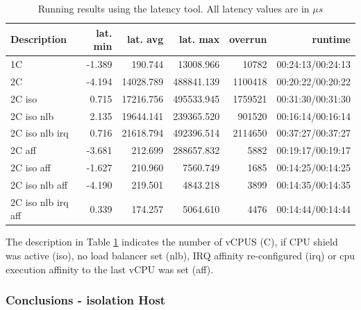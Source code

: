 \documentclass[]{scrartcl}
\begin{document}
\begin{table}[h]
	\caption{Running results using the  latency tool. All latency values are in $\mu s$}
	\begin{tabular}{l|r|r| r|r | r }
		Description &lat. min&lat. avg& lat. max&overrun& runtime\\
		\hline
		1C&     -1.389&    190.744&  13008.966&   10782&    00:24:13/00:24:13\\
		2C&     -4.194&  14028.789& 488841.139& 1100418&    00:20:22/00:20:22\\
		2C iso&      0.715&  17216.756& 495533.945& 1759521&    00:31:30/00:31:30\\
		2C iso nlb&      2.135&  19644.141& 239365.520&  901520&   00:16:14/00:16:14\\
		2C iso nlb irq&      0.716&  21618.794& 492396.514& 2114650&  00:37:27/00:37:27\\
		2C aff&     -3.681&    212.699& 288657.832&    5882&   00:19:17/00:19:17\\
		2C iso aff &     -1.627&    210.960&   7560.749&    1685&  00:14:25/00:14:25\\
		2C iso nlb aff &     -4.190&    219.501&   4843.218&    3899&    00:14:35/00:14:35\\
		2C iso nlb irq aff&      0.339&    174.257&   5064.610&    4476&   00:14:44/00:14:44\\

	\end{tabular}
	\label{tab:latency}
\end{table}

The description in Table \ref{tab:latency} indicates the number of vCPUS (C), if CPU shield was active (iso), no load balancer set (nlb), IRQ affinity re-configured (irq) or cpu execution affinity to the last vCPU was set (aff).

\subsubsection{Conclusions - isolation Host}
\label{sec:conciso}
\end{document}
